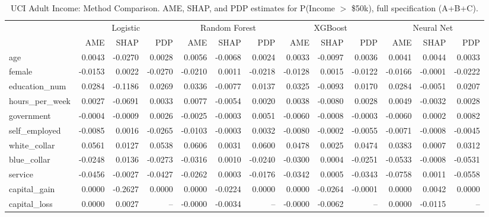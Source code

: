 \documentclass[12pt]{article}
\begin{document}
	\begin{table}
		\centering
		\small
		\begin{threeparttable}
			\caption{UCI Adult Income: Method Comparison. AME, SHAP, and PDP estimates for P(Income $>$ \$50k), full specification (A+B+C).}
			\label{tab:adult_method_comparison}
			\begin{tabular}{lrrrrrrrrrrrr}
				\toprule
				& \multicolumn{3}{c}{Logistic} & \multicolumn{3}{c}{Random Forest} & \multicolumn{3}{c}{XGBoost} & \multicolumn{3}{c}{Neural Net} \\
				\cmidrule(lr){2-4} \cmidrule(lr){5-7} \cmidrule(lr){8-10} \cmidrule(lr){11-13}
				& AME & SHAP & PDP & AME & SHAP & PDP & AME & SHAP & PDP & AME & SHAP & PDP \\
				\midrule
				age & 0.0043 & -0.0270 & 0.0028 & 0.0056 & -0.0068 & 0.0024 & 0.0033 & -0.0097 & 0.0036 & 0.0041 & 0.0044 & 0.0033 \\
				female & -0.0153 & 0.0022 & -0.0270 & -0.0210 & 0.0011 & -0.0218 & -0.0128 & 0.0015 & -0.0122 & -0.0166 & -0.0001 & -0.0222 \\
				education\_num & 0.0284 & -0.1186 & 0.0269 & 0.0336 & -0.0077 & 0.0137 & 0.0325 & -0.0093 & 0.0170 & 0.0284 & -0.0051 & 0.0207 \\
				\midrule
				hours\_per\_week & 0.0027 & -0.0691 & 0.0033 & 0.0077 & -0.0054 & 0.0020 & 0.0038 & -0.0080 & 0.0028 & 0.0049 & -0.0032 & 0.0028 \\
				government & -0.0004 & -0.0009 & 0.0026 & -0.0025 & -0.0003 & 0.0051 & -0.0060 & -0.0008 & -0.0003 & -0.0060 & 0.0002 & 0.0082 \\
				self\_employed & -0.0085 & 0.0016 & -0.0265 & -0.0103 & -0.0003 & 0.0032 & -0.0080 & -0.0002 & -0.0055 & -0.0071 & -0.0008 & -0.0045 \\
				white\_collar & 0.0561 & 0.0127 & 0.0538 & 0.0606 & 0.0031 & 0.0600 & 0.0478 & 0.0025 & 0.0474 & 0.0383 & 0.0007 & 0.0312 \\
				blue\_collar & -0.0248 & 0.0136 & -0.0273 & -0.0316 & 0.0010 & -0.0240 & -0.0300 & 0.0004 & -0.0251 & -0.0533 & -0.0008 & -0.0531 \\
				service & -0.0456 & -0.0027 & -0.0427 & -0.0262 & 0.0003 & -0.0176 & -0.0342 & 0.0005 & -0.0343 & -0.0758 & 0.0011 & -0.0558 \\
				\midrule
				capital\_gain & 0.0000 & -0.2627 & 0.0000 & 0.0000 & -0.0224 & 0.0000 & 0.0000 & -0.0264 & -0.0001 & 0.0000 & 0.0042 & 0.0000 \\
				capital\_loss & 0.0000 & 0.0027 & -- & -0.0000 & -0.0034 & -- & -0.0000 & -0.0062 & -- & 0.0000 & -0.0115 & -- \\

\end{tabular}
\end{threeparttable}
\end{table}
\end{document}
